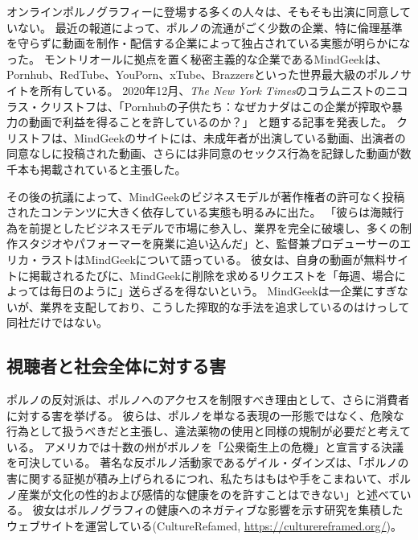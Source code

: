 \documentclass[paper=a4,book,openany]{jlreq}
\begin{document}
オンラインポルノグラフィーに登場する多くの人々は、そもそも出演に同意していない。
最近の報道によって、ポルノの流通がごく少数の企業、特に倫理基準を守らずに動画を制作・配信する企業によって独占されている実態が明らかになった。
モントリオールに拠点を置く秘密主義的な企業であるMindGeekは、Pornhub、RedTube、YouPorn、xTube、Brazzersといった世界最大級のポルノサイトを所有している。
2020年12月、\emph{The New York Times}のコラムニストのニコラス・クリストフは、「Pornhubの子供たち：なぜカナダはこの企業が搾取や暴力の動画で利益を得ることを許しているのか？」
と題する記事を発表した\citep{kristof20:_child_pornh}。
クリストフは、MindGeekのサイトには、未成年者が出演している動画、出演者の同意なしに投稿された動画、さらには非同意のセックス行為を記録した動画が数千本も掲載されていると主張した。

その後の抗議によって、MindGeekのビジネスモデルが著作権者の許可なく投稿されたコンテンツに大きく依存している実態も明るみに出た。
「彼らは海賊行為を前提としたビジネスモデルで市場に参入し、業界を完全に破壊し、多くの制作スタジオやパフォーマーを廃業に追い込んだ」と、監督兼プロデューサーのエリカ・ラストはMindGeekについて語っている。
彼女は、自身の動画が無料サイトに掲載されるたびに、MindGeekに削除を求めるリクエストを「毎週、場合によっては毎日のように」送らざるを得ないという\citep{nilsson20:_secret_world_mindg}。
MindGeekは一企業にすぎないが、業界を支配しており、こうした搾取的な手法を追求しているのはけっして同社だけではない。

\subsection{視聴者と社会全体に対する害}

ポルノの反対派は、ポルノへのアクセスを制限すべき理由として、さらに消費者に対する害を挙げる。
彼らは、ポルノを単なる表現の一形態ではなく、危険な行為として扱うべきだと主張し、違法薬物の使用と同様の規制が必要だと考えている。
アメリカでは十数の州がポルノを「公衆衛生上の危機」と宣言する決議を可決している\citep{quinn19:_is_porn_public_healt_crisis}。
著名な反ポルノ活動家であるゲイル・ダインズは、「ポルノの害に関する証拠が積み上げられるにつれ、私たちはもはや手をこまねいて、ポルノ産業が文化の性的および感情的な健康をのを許すことはできない」と述べている\citep{dines16:_why_porn_is_public_healt_issue}。
彼女はポルノグラフィの健康へのネガティブな影響を示す研究を集積したウェブサイトを運営している(CultureRefamed, \url{https://culturereframed.org/})。
\end{document}
